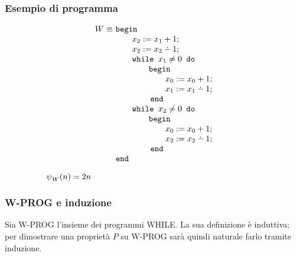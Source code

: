 \subsubsection*{Esempio di programma}
\vspace{-1em}
\begin{minipage}{.34\textwidth}
    \begin{align}
        W \equiv\ & \textbegin                      \notag\\[-.3em]
        & \qquad x_2 := x_1+1;                      \notag\\[-.3em]
        & \qquad x_2 := x_2\dotminus 1;             \notag\\[-.3em]
        & \qquad \while{x_1}                        \notag\\[-.3em]
        & \qquad\qquad \textbegin                   \notag\\[-.3em]
        & \qquad\qquad\qquad x_0 := x_0+1;          \notag\\[-.3em]
        & \qquad\qquad\qquad x_1 := x_1\dotminus 1; \notag\\[-.3em]
        & \qquad\ \ \ \ \ \textend                  \notag\\[-.3em]
        & \qquad \while{x_2}                        \notag\\[-.3em]
        & \qquad\qquad \textbegin                   \notag\\[-.3em]
        & \qquad\qquad\qquad x_0 := x_0+1;          \notag\\[-.3em]
        & \qquad\qquad\qquad x_2 := x_2\dotminus 1; \notag\\[-.3em]
        & \qquad\ \ \ \ \ \textend                  \notag\\[-.3em]
        & \hspace{-.5em}\textend                            \notag
    \end{align}
\end{minipage} \hspace{1em}
\begin{minipage}{.6\textwidth}
    $\qquad\qquad\ \ \ \semWHILE_W(n) = 2n $
\end{minipage}

\subsubsection*{W-PROG e induzione}
Sia W-PROG l'insieme dei programmi WHILE. La sua definizione è induttiva; per dimostrare
una proprietà $P$ su W-PROG sarà quindi naturale farlo tramite induzione.

